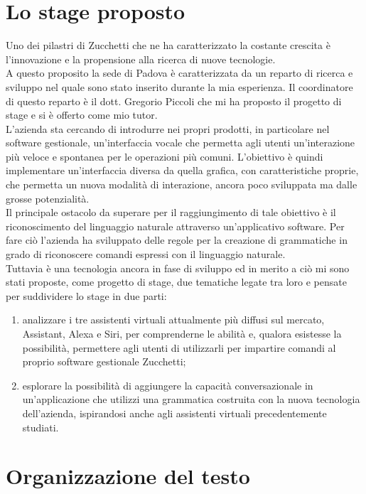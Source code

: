 \section{Lo stage proposto}
Uno dei pilastri di Zucchetti che ne ha caratterizzato la costante crescita è l'innovazione e la propensione alla ricerca di nuove tecnologie. \\
A questo proposito la sede di Padova è caratterizzata da un reparto di ricerca e sviluppo nel quale sono stato inserito durante la mia esperienza. Il coordinatore di questo reparto è il dott. Gregorio Piccoli che mi ha proposto il progetto di stage e si è offerto come mio tutor. \\
L'azienda sta cercando di introdurre nei propri prodotti, in particolare nel software gestionale, un'interfaccia vocale che permetta agli utenti un'interazione più veloce e spontanea per le operazioni più comuni. L'obiettivo è quindi implementare un'interfaccia diversa da quella grafica, con caratteristiche proprie, che permetta un nuova modalità di interazione, ancora poco sviluppata ma dalle grosse potenzialità. \\
Il principale ostacolo da superare per il raggiungimento di tale obiettivo è il riconoscimento del linguaggio naturale attraverso un'applicativo software. Per fare ciò l'azienda ha sviluppato delle regole per la creazione di grammatiche in grado di riconoscere comandi espressi con il linguaggio naturale. \\
Tuttavia è una tecnologia ancora in fase di sviluppo ed in merito a ciò mi sono stati proposte, come progetto di stage, due tematiche legate tra loro e pensate per suddividere lo stage in due parti:
\begin{enumerate}
	\item analizzare i tre assistenti virtuali attualmente più diffusi sul mercato, Assistant, Alexa e Siri, per comprenderne le abilità e, qualora esistesse la possibilità, permettere agli utenti di utilizzarli per impartire comandi al proprio software gestionale Zucchetti;
	\item esplorare la possibilità di aggiungere la capacità conversazionale in un'applicazione che utilizzi una grammatica costruita con la nuova tecnologia dell'azienda, ispirandosi anche agli assistenti virtuali precedentemente studiati.
\end{enumerate}

\section{Organizzazione del testo}

